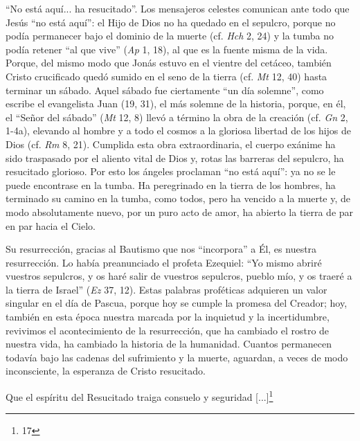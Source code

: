 			\begin{body}“No está aquí... ha resucitado”. Los mensajeros celestes comunican ante todo que Jesús “no está aquí”: el Hijo de Dios no ha quedado en el sepulcro, porque no podía permanecer bajo el dominio de la muerte (cf. \textit{Hch} 2, 24) y la tumba no podía retener “al que vive” (\textit{Ap} 1, 18), al que es la fuente misma de la vida. Porque, del mismo modo que Jonás estuvo en el vientre del cetáceo, también Cristo crucificado quedó sumido en el seno de la tierra (cf. \textit{Mt} 12, 40) hasta terminar un sábado. Aquel sábado fue ciertamente “un día solemne”, como escribe el evangelista Juan (19, 31), el más solemne de la historia, porque, en él, el “Señor del sábado” (\textit{Mt }12, 8) llevó a término la obra de la creación (cf. \textit{Gn} 2, 1-4a), elevando al hombre y a todo el cosmos a la gloriosa libertad de los hijos de Dios (cf. \textit{Rm }8, 21). Cumplida esta obra extraordinaria, el cuerpo exánime ha sido traspasado por el aliento vital de Dios y, rotas las barreras del sepulcro, ha resucitado glorioso. Por esto los ángeles proclaman “no está aquí”: ya no se le puede encontrase en la tumba. Ha peregrinado en la tierra de los hombres, ha terminado su camino en la tumba, como todos, pero ha vencido a la muerte y, de modo absolutamente nuevo, por un puro acto de amor, ha abierto la tierra de par en par hacia el Cielo. \end{body}
			
			\begin{body}Su resurrección, gracias al Bautismo que nos “incorpora” a Él, es nuestra resurrección. Lo había preanunciado el profeta Ezequiel: “Yo mismo abriré vuestros sepulcros, y os haré salir de vuestros sepulcros, pueblo mío, y os traeré a la tierra de Israel” (\textit{Ez} 37, 12). Estas palabras proféticas adquieren un valor singular en el día de Pascua, porque hoy se cumple la promesa del Creador; hoy, también en esta época nuestra marcada por la inquietud y la incertidumbre, revivimos el acontecimiento de la resurrección, que ha cambiado el rostro de nuestra vida, ha cambiado la historia de la humanidad. Cuantos permanecen todavía bajo las cadenas del sufrimiento y la muerte, aguardan, a veces de modo inconsciente, la esperanza de Cristo resucitado. \end{body}
			
			\begin{body}Que el espíritu del Resucitado traiga consuelo y seguridad [...]\footnote{17} \end{body}
			

